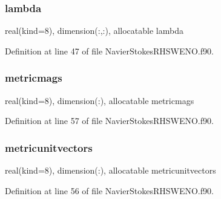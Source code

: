 \subsubsection{\texorpdfstring{lambda}{lambda}}
{\footnotesize\ttfamily real(kind=8), dimension(\+:,\+:), allocatable lambda}



Definition at line 47 of file Navier\+Stokes\+R\+H\+S\+W\+E\+N\+O.\+f90.

\hypertarget{structnavierstokesrhsweno_1_1dissipation__local_ad67c0bcebcc2ec1c9216309d94e198fb}{}\label{structnavierstokesrhsweno_1_1dissipation__local_ad67c0bcebcc2ec1c9216309d94e198fb} 
\subsubsection{\texorpdfstring{metricmags}{metricmags}}
{\footnotesize\ttfamily real(kind=8), dimension(\+:), allocatable metricmags}



Definition at line 57 of file Navier\+Stokes\+R\+H\+S\+W\+E\+N\+O.\+f90.

\hypertarget{structnavierstokesrhsweno_1_1dissipation__local_a71d05dbf0f57671a5bd625e056830e5f}{}\label{structnavierstokesrhsweno_1_1dissipation__local_a71d05dbf0f57671a5bd625e056830e5f} 
\subsubsection{\texorpdfstring{metricunitvectors}{metricunitvectors}}
{\footnotesize\ttfamily real(kind=8), dimension(\+:), allocatable metricunitvectors}



Definition at line 56 of file Navier\+Stokes\+R\+H\+S\+W\+E\+N\+O.\+f90.

\hypertarget{structnavierstokesrhsweno_1_1dissipation__local_a63bb950c5ab0f336ef9538935944d0fc}{}\label{structnavierstokesrhsweno_1_1dissipation__local_a63bb950c5ab0f336ef9538935944d0fc} 

